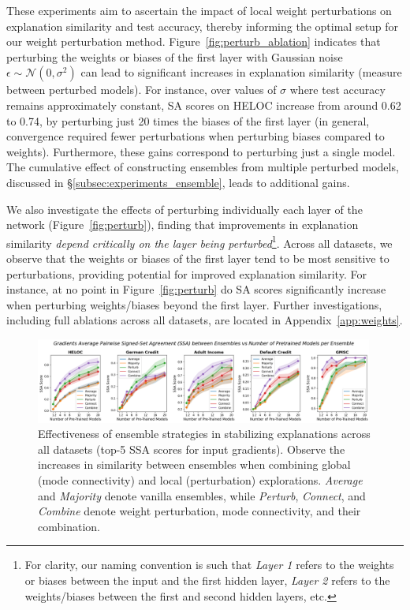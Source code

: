 These experiments aim to ascertain the impact of local weight perturbations on explanation similarity and test accuracy, thereby informing the optimal setup for our weight perturbation method. Figure~\ref{fig:perturb_ablation} indicates that perturbing the weights or biases of the first layer with Gaussian noise $\epsilon \sim\mathcal{N}(0,\sigma^2)$ can lead to significant increases in explanation similarity (measure between perturbed models). For instance, over values of $\sigma$ where test accuracy remains approximately constant, SA scores on HELOC increase from around 0.62 to 0.74, by perturbing just 20 times the biases of the first layer (in general, convergence required fewer perturbations when perturbing biases compared to weights). Furthermore, these gains correspond to perturbing just a single model. The cumulative effect of constructing ensembles from multiple perturbed models, discussed in \S\ref{subsec:experiments_ensemble}, leads to additional gains. 

We also investigate the effects of perturbing individually each layer of the network (Figure~\ref{fig:perturb}), finding that improvements in explanation similarity \textit{depend critically on the layer being perturbed}\footnote{For clarity, our naming convention is such that \textit{Layer 1} refers to the weights or biases between the input and the first hidden layer, \textit{Layer 2} refers to the weights/biases between the first and second hidden layers, etc.}. Across all datasets, we observe that the weights or biases of the first layer tend to be most sensitive to perturbations, providing potential for improved explanation similarity. For instance, at no point in Figure~\ref{fig:perturb} do SA scores significantly increase when perturbing weights/biases beyond the first layer. Further investigations, including full ablations across all datasets, are located in Appendix~\ref{app:weights}.



\begin{figure}
    \centering
    \includegraphics[width=0.99\textwidth]{figures/ssa_top5_gradients.png}
    \caption{\small Effectiveness of ensemble strategies in stabilizing explanations across all datasets (top-5 SSA scores for input gradients). Observe the increases in similarity between ensembles when combining global (mode connectivity) and local (perturbation) explorations. \textit{Average} and \textit{Majority} denote vanilla ensembles, while \textit{Perturb}, \textit{Connect}, and \textit{Combine} denote weight perturbation, mode connectivity, and their combination.}%
    \label{fig:ensembles}
\end{figure}

